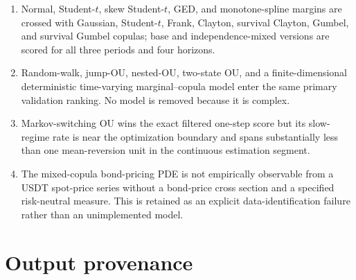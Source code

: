 \documentclass[11pt]{article}
\newcommand{\1}{\mathbf{1}}
\begin{document}
\begin{enumerate}
the same implementation-status table.
\item[\checkmark] Normal, Student-$t$, skew Student-$t$, GED, and monotone-spline
margins are crossed with Gaussian, Student-$t$, Frank, Clayton, survival Clayton,
Gumbel, and survival Gumbel copulas; base and independence-mixed versions are
scored for all three periods and four horizons.
\item[\checkmark] Random-walk, jump-OU, nested-OU, two-state OU, and a
finite-dimensional deterministic time-varying marginal--copula model enter the
same primary validation ranking.  No model is removed because it is complex.
\item[$\triangle$] Markov-switching OU wins the exact filtered one-step score but
its slow-regime rate is near the optimization boundary and spans substantially
less than one mean-reversion unit in the continuous estimation segment.
\item[$\times$] The mixed-copula bond-pricing PDE is not empirically observable
from a USDT spot-price series without a bond-price cross section and a specified
risk-neutral measure.  This is retained as an explicit data-identification
failure rather than an unimplemented model.
\end{enumerate}

\section{Output provenance}
\label{emp:app:provenance}
\end{document}
